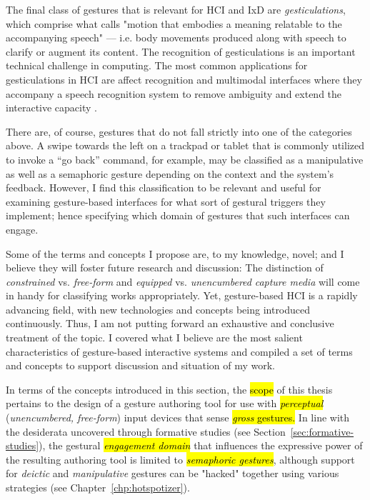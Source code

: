 The final class of gestures that is relevant for HCI and IxD are \emph{gesticulations}, which comprise what \textcite{McNeill:2008} calls "motion that embodies a meaning relatable to the accompanying speech" --– i.e. body movements produced along with speech to clarify or augment its content. The recognition of gesticulations is an important technical challenge in computing. The most common applications for gesticulations in HCI are affect recognition and multimodal interfaces where they accompany a speech recognition system to remove ambiguity and extend the interactive capacity \parencite{Kopp:2004, Krum:2002, Silva:2003}.

There are, of course, gestures that do not fall strictly into one of the categories above. A swipe towards the left on a trackpad or tablet that is commonly utilized to invoke a “go back” command, for example, may be classified as a manipulative as well as a semaphoric gesture depending on the context and the system’s feedback. However, I find this classification to be relevant and useful for examining gesture-based interfaces for what sort of gestural triggers they implement; hence specifying which domain of gestures that such interfaces can engage.

Some of the terms and concepts I propose are, to my knowledge, novel; and I believe they will foster future research and discussion: The distinction of \emph{constrained} vs. \emph{free-form} and \emph{equipped} vs. \emph{unencumbered} \emph{capture media} will come in handy for classifying works appropriately. Yet, gesture-based HCI is a rapidly advancing field, with new technologies and concepts being introduced continuously. Thus, I am not putting forward an exhaustive and conclusive treatment of the topic. I covered what I believe are the most salient characteristics of gesture-based interactive systems and compiled a set of terms and concepts to support discussion and situation of my work.

In terms of the concepts introduced in this section, the \hl{scope} of this thesis pertains to the design of a gesture authoring tool for use with \hl{\emph{perceptual}} (\emph{unencumbered, free-form}) input devices that sense \hl{\emph{gross} gestures.} In line with the desiderata uncovered through formative studies (see Section~\ref{sec:formative-studies}), the gestural \hl{\emph{engagement domain}} that influences the expressive power of the resulting authoring tool is limited to \hl{\emph{semaphoric gestures}}, although support for \emph{deictic} and \emph{manipulative} gestures can be "hacked" together using various strategies (see Chapter~\ref{chp:hotspotizer}).

